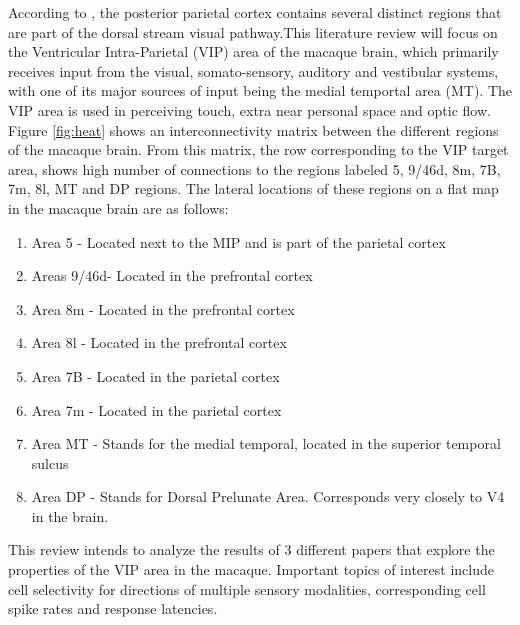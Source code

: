 \documentclass[10pt,oneside,final]{article}
\begin{document}
        According to \cite{Duhamel1998}, the posterior parietal cortex contains several distinct regions that are part of the dorsal stream visual pathway.This literature review will focus on the Ventricular Intra-Parietal (VIP) area of the macaque brain, which primarily receives input from the visual, somato-sensory, auditory and vestibular systems, with one of its major sources of input being the medial temportal area (MT). The VIP area is used in perceiving touch, extra near personal space and optic flow\cite{kruger2013deep}.
        Figure \ref{fig:heat} shows an interconnectivity matrix between the different regions of the macaque brain. From this matrix, the row corresponding to the VIP target area, shows high number of connections to the regions labeled 5, 9/46d, 8m, 7B, 7m, 8l, MT and DP regions. The lateral locations of these regions on a flat map in the macaque brain are as follows:
        \begin{enumerate}
            \item{Area 5 - Located next to the MIP and is part of the parietal cortex}
            \item{Areas 9/46d- Located in the prefrontal cortex}
            \item{Area 8m - Located in the prefrontal cortex}
            \item{Area 8l - Located in the prefrontal cortex}
            \item{Area 7B - Located in the parietal cortex}
            \item{Area 7m - Located in the parietal cortex}
            \item{Area MT - Stands for the medial temporal, located in the superior temporal sulcus}
            \item{Area DP - Stands for Dorsal Prelunate Area. Corresponds very closely to V4 in the brain.}
        \end{enumerate}

        This review intends to analyze the results of 3 different papers that explore the properties of the VIP area in the macaque. Important topics of interest include cell selectivity for directions of multiple sensory modalities, corresponding cell spike rates and response latencies.
\end{document}
